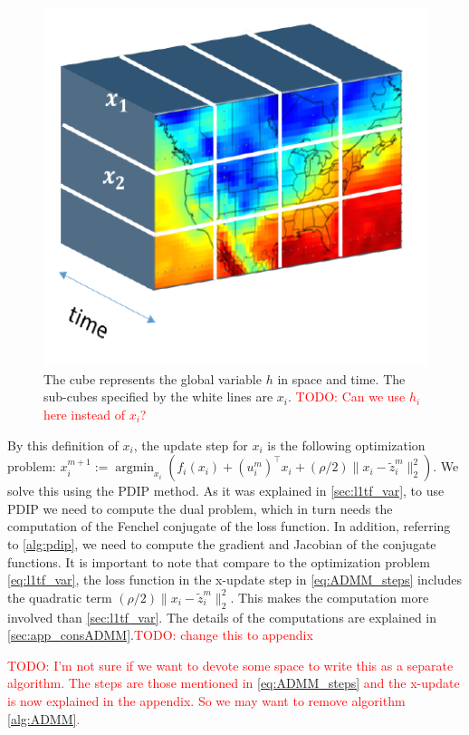 \documentclass{article}
\DeclareMathOperator*{\argmin}{argmin}
\newcommand{\attn}[1]{\textcolor{red}{TODO: #1}}
\begin{document}
\begin{figure}[tb]
  \centering
  \includegraphics[height=.2\textheight]{Figures/data_cube}
    \caption{The cube represents the global variable $h$ in space and
      time. The sub-cubes specified by the white lines are
      $x_i$. \attn{Can we use $h_i$ here instead of $x_i$?}}
    \label{fig:data_cube}
\end{figure} 


By this definition of $x_i$, the update step for $x_i$ is the
following optimization problem: $x_i^{m+1}:=\argmin_{x_i} ( f_i(x_i) +
(u_i^m)^\top x_i + (\rho/2) \lVert x_i-\tilde{z}_i^m \lVert_2^2)$. We solve this using the PDIP method. As it was explained in \autoref{sec:l1tf_var}, to use PDIP we need to compute the dual problem, which in turn needs the computation of the Fenchel conjugate of the loss function. In addition, referring to \autoref{alg:pdip}, we need to compute the gradient and Jacobian of the conjugate functions. It is important to note that compare to the optimization problem \autoref{eq:l1tf_var}, the loss function in the x-update step in \autoref{eq:ADMM_steps} includes the quadratic term $(\rho/2) \lVert x_i-\tilde{z}_i^m \lVert_2^2$. This makes the computation more involved than \autoref{sec:l1tf_var}. The details of the computations are explained in \autoref{sec:app_consADMM}.\attn{change this to appendix}

\attn{I'm not sure if we want to devote some space to write this as a separate algorithm. The steps are those mentioned in \ref{eq:ADMM_steps} and the x-update is now explained in the appendix. So we may want to remove algorithm \ref{alg:ADMM}.}
\end{document}

